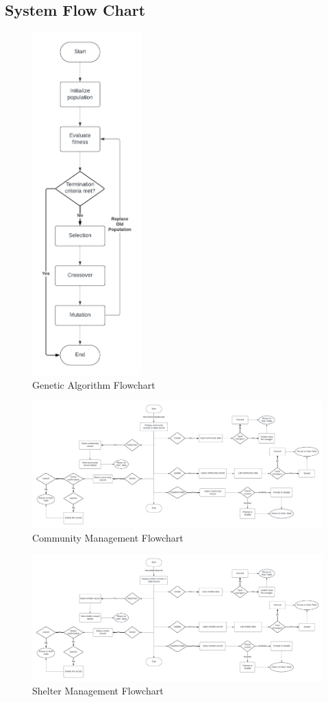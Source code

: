 \begin{appendices}
	\chapter{System Flow Chart}
	
	\begin{figure}[h!]
		\caption{Genetic Algorithm Flowchart}
		\centering
		\includegraphics[height=500px]{Genetic Algorithm Flowchart}
	\end{figure}
	
	\begin{figure}[h!]
		\caption{Community Management Flowchart}
		\centering
		\includegraphics[width=\linewidth]{Community Management Flowchart}
	\end{figure}
	
	\begin{figure}[h!]
		\caption{Shelter Management Flowchart}
		\centering
		\includegraphics[width=\linewidth]{Shelter Management Flowchart}
	\end{figure}
	
\end{appendices}